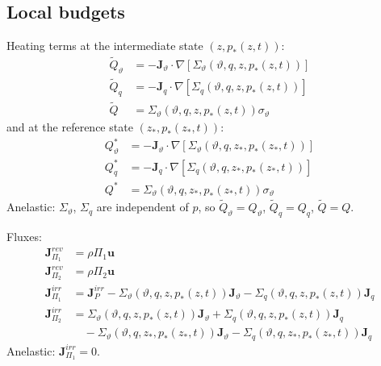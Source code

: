 \documentclass{article}
\begin{document}
\subsection{Local budgets}
Heating terms at the intermediate state \((z, p_*(z, t))\):
\begin{align}
    \tilde{Q}_\vartheta
    & =
    - \mathbf{J}_\vartheta \cdot \nabla \left[ \Sigma_\vartheta(\vartheta, q, z, p_*(z, t)) \right]
    \\
    \tilde{Q}_q
    & =
    - \mathbf{J}_q \cdot \nabla \left[ \Sigma_q(\vartheta, q, z, p_*(z, t)) \right]
    \\
    \tilde{Q}
    & =
    \Sigma_\vartheta(\vartheta, q, z, p_*(z, t)) \sigma_\vartheta
\end{align}
and at the reference state \((z_*, p_*(z_*, t))\):
\begin{align}
    Q_\vartheta^*
    & =
    - \mathbf{J}_\vartheta \cdot \nabla \left[ \Sigma_\vartheta(\vartheta, q, z_*, p_*(z_*, t)) \right]
    \\
    Q_q^*
    & =
    - \mathbf{J}_q \cdot \nabla \left[ \Sigma_q(\vartheta, q, z_*, p_*(z_*, t)) \right]
    \\
    Q^*
    & =
    \Sigma_\vartheta(\vartheta, q, z_*, p_*(z_*, t)) \sigma_\vartheta
\end{align}
Anelastic: \(\Sigma_\vartheta\), \(\Sigma_q\) are independent of \(p\), so \(\tilde{Q}_\vartheta = Q_\vartheta\), \(\tilde{Q}_q = Q_q\), \(\tilde{Q} = Q\).

Fluxes:
\begin{align}
    \mathbf{J}_{\Pi_1}^{rev}
    & =
    \rho \Pi_1 \mathbf{u}
    \\
    \mathbf{J}_{\Pi_2}^{rev}
    & =
    \rho \Pi_2 \mathbf{u}
    \\
    \mathbf{J}_{\Pi_1}^{irr}
    & =
    \mathbf{J}_P^{irr}
    - \Sigma_\vartheta(\vartheta, q, z, p_*(z, t)) \mathbf{J}_\vartheta
    - \Sigma_q(\vartheta, q, z, p_*(z, t)) \mathbf{J}_q
    \\
    \mathbf{J}_{\Pi_2}^{irr}
    & =
    \Sigma_\vartheta(\vartheta, q, z, p_*(z, t)) \mathbf{J}_\vartheta
    + \Sigma_q(\vartheta, q, z, p_*(z, t)) \mathbf{J}_q
    \nonumber
    \\
    & \quad
    - \Sigma_\vartheta(\vartheta, q, z_*, p_*(z_*, t)) \mathbf{J}_\vartheta
    - \Sigma_q(\vartheta, q, z_*, p_*(z_*, t)) \mathbf{J}_q
\end{align}
Anelastic: \(\mathbf{J}_{\Pi_1}^{irr} = 0\).
\end{document}
